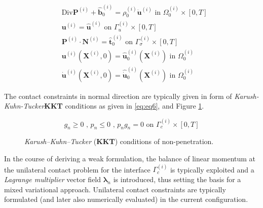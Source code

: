 \documentclass[a4paper,10pt]{article} %
\begin{document}
\begin{subequations}\label{eq:eq0}
\begin{align}
 & \text{Div} \mathbf{P}^{(i)}+\hat{\mathbf{b}}_0^{(i)}=\rho_0^{(i)}\ddot{\mathbf{u}}^{(i)} \text{ in } \Omega_0^{(i)} \times [0, T] \label{eq:subeq1}\\
 & \mathbf{u}^{(i)} = \hat{\mathbf{u}}^{(i)} \text{ on } \Gamma_u^{(i)} \times [0, T] \label{eq:subeq2}\\
 & \mathbf{P}^{(i)} \cdot \mathbf{N}^{(i)} = \hat{\mathbf{t}}_0^{(i)} \text{ on } \Gamma_\sigma^{(i)} \times [0, T] \label{eq:subeq3} \\
 & \mathbf{u}^{(i)}\left( \mathbf{X}^{(i)}, 0\right) = \hat{\mathbf{u}}_0^{(i)}\left( \mathbf{X}^{(i)}\right) \text{ in } \Omega_0^{(i)} \label{eq:subeq4} \\
 & \dot{\mathbf{u}}^{(i)}\left( \mathbf{X}^{(i)}, 0\right) = \hat{\dot{\mathbf{u}}}_0^{(i)}\left( \mathbf{X}^{(i)}\right) \text{ in } \Omega_0^{(i)} \label{eq:subeq5}
 \end{align}
\end{subequations}

The contact constraints in normal direction are typically given in form of \textit{Karush-Kuhn-Tucker}\textbf{KKT} conditions as given in \eqref{eq:eq6}, and Figure \ref{fig:kkt}.
 
 \begin{equation}\label{eq:eq6}
g_n \geq 0 \text{ , } p_n \leq 0 \text{ , } p_n g_n = 0 \text{ on } \Gamma_c^{(i)} \times [0, T]
 \end{equation}

\begin{figure}[h]
\begin{center}
\caption{\textit{Karush–Kuhn–Tucker} (\textbf{KKT}) conditions of non-penetration.}
\label{fig:kkt}
\end{center}
\end{figure}

 
In the course of deriving a weak formulation, the balance of linear momentum at the unilateral contact problem  for the interface $\Gamma_c^{(i)}$ is typically exploited and a \textit{Lagrange multiplier} vector field $\boldsymbol{\lambda}_n$ is introduced, thus setting the basis for a mixed variational approach. Unilateral contact constraints are typically
formulated (and later also numerically evaluated) in the current configuration.
\end{document}
